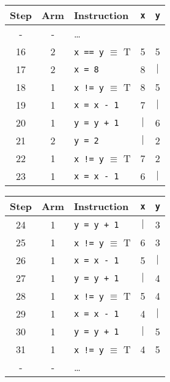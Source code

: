 \documentclass[11pt]{article}
\newcommand{\code}[1]{\texttt{#1}}
\begin{document}
\begin{enumerate}
\begin{enumerate}
	\begin{tabular}{c |c | l | c | c }
		Step & Arm & Instruction	&	\code{x}	&  \code{y}	\\
		\hline
		- 	& - & \ldots & & \\
		16 	& 2 & \code{x == y} $\equiv$ T	&	5	&	5\\
		17 	& 2 & \code{x = 8}				&	8	&	$|$\\
		18 	& 1 & \code{x != y} $\equiv$ T	&	8	&	5\\
		19 	& 1 & \code{x = x - 1}			&	7	&	$|$\\
		20 	& 1 & \code{y = y + 1}			&	$|$	&	6\\
		21 	& 2 & \code{y = 2}				&	$|$	&	2\\
		22 	& 1 & \code{x != y} $\equiv$ T	&	7	&	2\\
		23 	& 1 & \code{x = x - 1}			&	6	&	$|$\\
		\end{tabular}\hspace{0.8cm}
	\begin{tabular}{c |c | l | c | c }
		Step & Arm & Instruction	&	\code{x}	&  \code{y}	\\
		\hline
		24 	& 1 & \code{y = y + 1}			&	$|$	&	3\\
		25 	& 1 & \code{x != y} $\equiv$ T	&	6	&	3\\
		26 	& 1 & \code{x = x - 1}			&	5	&	$|$\\
		27 	& 1 & \code{y = y + 1}			&	$|$	&	4\\
		28 	& 1 & \code{x != y} $\equiv$ T	&	5	&	4\\
		29 	& 1 & \code{x = x - 1}			&	4	&	$|$\\
		30 	& 1 & \code{y = y + 1}			&	$|$	&	5\\
		31 	& 1 & \code{x != y} $\equiv$ T	&	4	&	5\\
		- 	& -	& \ldots & &\\
		
	\end{tabular}\\
	

\end{enumerate}
\end{enumerate}
\end{document}
